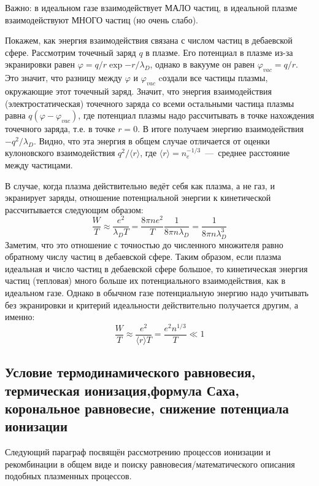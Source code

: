 \documentclass[10pt, a4paper]{article}
\numberwithin{equation}{section}
\begin{document}
Важно: в идеальном газе взаимодействует МАЛО частиц, в идеальной плазме взаимодействуют МНОГО частиц (но очень слабо).

Покажем, как энергия взаимодействия связана с числом частиц в дебаевской сфере. Рассмотрим точечный заряд $q$ в плазме. Его потенциал в плазме из-за экранировки равен $\varphi = q/r\exp{-r/\lambda_D}$, однако в вакууме он равен $\varphi_{vac}=q/r$. Это значит, что разницу между $\varphi$ и $\varphi_{vac}$ cоздали все частицы плазмы, окружающие этот точечный заряд.
Значит, что энергия взаимодействия (электростатическая) точечного заряда со всеми остальными частица плазмы равна $q (\varphi - \varphi_{vac})$, где потенциал плазмы надо рассчитывать в точке нахождения точечного заряда, т.е. в точке $r=0$. В итоге получаем энергию взаимодействия $-q^2/\lambda_D$.
Видно, что эта энергия в общем случае отличается от оценки кулоновского взаимодействия $q^2/\langle r\rangle$, где $\langle r \rangle = n_e^{-1/3}$~---~среднее расстояние между частицами.

В случае, когда плазма действительно ведёт себя как плазма, а не газ, и экранирует заряды, отношение потенциальной энергии к кинетической рассчитывается следующим образом:
\begin{equation}
	\frac{W}{T} \approx \frac{e^2}{\lambda_D T} = \frac{8\pi n e^2}{T}\frac{1}{8\pi n\lambda_D} = \frac{1}{8\pi n \lambda_D^3}
\end{equation}
Заметим, что это отношение с точностью до численного множителя равно обратному числу частиц в дебаевской сфере. Таким образом, если плазма идеальная и число частиц в дебаевской сфере большое, то кинетическая энергия частиц (тепловая) много больше их потенциального взаимодействия, как в идеальном газе. Однако в обычном газе потенциальную энергию надо учитывать без экранировки и критерий идеальности действительно получается другим, а именно:
\begin{equation}
	\frac{W}{T} \approx \frac{e^2}{\langle r \rangle T} = \frac{e^2 n^{1/3}}{T} \ll 1
\end{equation}

\subsection{Условие термодинамического равновесия, термическая ионизация,\linebreak формула Саха, корональное равновесие, снижение потенциала ионизации}

Следующий параграф посвящён рассмотрению процессов ионизации и рекомбинации в общем виде и поиску равновесия/математического описания подобных плазменных процессов.
\end{document}
